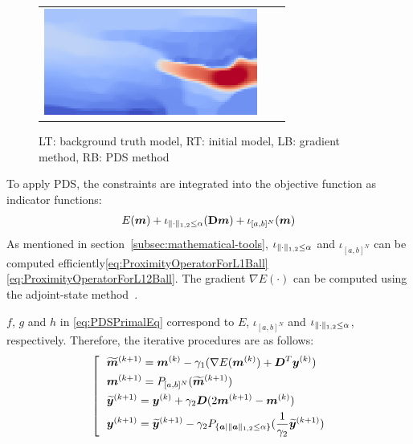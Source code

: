\begin{figure}[htbp]
\begin{tabular}{m{68mm} m{70mm} m{10mm}}
        \includegraphics[width=70mm]{public/pds} &
    \end{tabular}
    \caption{LT: background truth model, RT: initial model, LB: gradient method, RB: PDS method}
\end{figure}



To apply PDS, the constraints are integrated into the objective function as indicator functions:
\begin{equation} \label{eq:FWIObjectiveWithTVConstraintWithIndicatorFunction} \FWIObjectiveWithTVConstraintWithIndicatorFunction \end{equation}
As mentioned in section~\ref{subsec:mathematical-tools}, $\iota_{\LOneTwoNorm{\cdot} \le \alpha}$ and $\iota_{[a,b]^N}$ can be computed efficiently\eqref{eq:ProximityOperatorForL1Ball}\eqref{eq:ProximityOperatorForL12Ball}.
The gradient ${\nabla E(\cdot)}$ can be computed using the adjoint-state method~\cite{FWI-gradient}.

$f$, $g$ and $h$ in \eqref{eq:PDSPrimalEq} correspond to $E$, $\iota_{[a,b]^N}$ and $\iota_{\LOneTwoNorm{\cdot} \le \alpha}$, respectively.
Therefore, the iterative procedures are as follows:
\begin{equation} \label{eq:FWIWithPDS} \FWIWithPDS \notag \end{equation}

